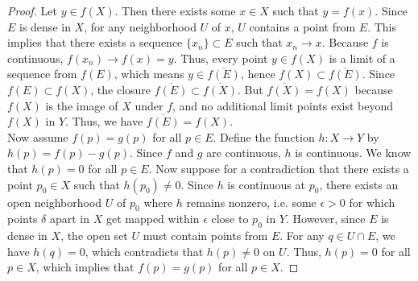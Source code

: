 \documentclass[11pt]{article}
\begin{document}
\begin{exercise}{4}
    \begin{proof}
        Let $y \in f(X)$. Then there exists some $x \in X$ such that $y = f(x)$. Since $E$ is dense in $X$, for any neighborhood $U$ of $x$, $U$ contains a point from $E$. This implies that there exists a sequence $\{ x_n \} \subset E$ such that $x_n \to x$. Because $f$ is continuous, $f(x_n) \to f(x) = y$. Thus, every point $y \in f(X)$ is a limit of a sequence from $f(E)$, which means $y \in \overline{f(E)}$, hence $f(X) \subset \overline{f(E)}$. Since $f(E) \subset f(X)$, the closure $\overline{f(E)} \subset \overline{f(X)}$. But $\overline{f(X)} = f(X)$ because $f(X)$ is the image of $X$ under $f$, and no additional limit points exist beyond $f(X)$ in $Y$. Thus, we have $\overline{f(E)} = f(X)$.  \\
        Now assume $f(p) = g(p)$ for all $p \in E$. Define the function $h: X \to Y$ by $h(p) = f(p) - g(p)$. Since $f$ and $g$ are continuous, $h$ is continuous. We know that $h(p) = 0$ for all $p \in E$. Now suppose for a contradiction that there exists a point $p_0 \in X$ such that $h(p_0) \neq 0$. Since $h$ is continuous at $p_0$, there exists an open neighborhood $U$ of $p_0$ where $h$ remains nonzero, i.e. some $\epsilon > 0$ for which points $\delta$ apart in $X$ get mapped within $\epsilon$ close to $p_0$ in $Y$. However, since $E$ is dense in $X$, the open set $U$ must contain points from $E$. For any $q \in U \cap E$, we have $h(q) = 0$, which contradicts that $h(p) \neq 0 $ on $U$. Thus, $h(p) = 0$ for all $p \in X$, which implies that $f(p) = g(p)$ for all $p \in X$. 
    \end{proof}
\end{exercise}
\end{document}
